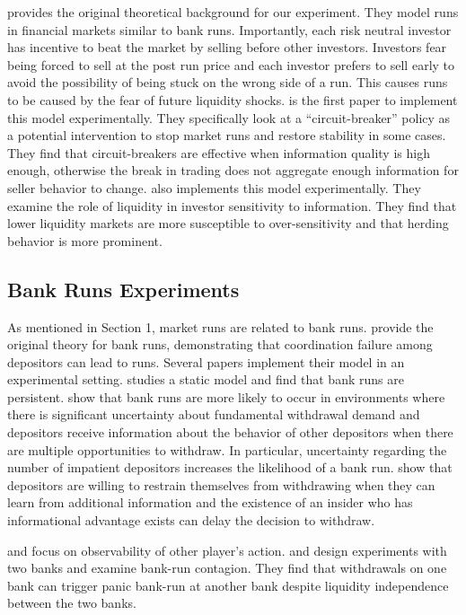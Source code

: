 \documentclass[11pt]{article}
\begin{document}
\cite{bernardo2004liquidity} provides the original theoretical background for our experiment. They model runs in financial markets similar to bank runs. Importantly, each risk neutral investor has incentive to beat the market by selling before other investors. Investors fear being forced to sell at the post run price and each investor prefers to sell early to avoid the possibility of being stuck on the wrong side of a run. This causes runs to be caused by the fear of future liquidity shocks. \cite{magnani2020dynamic} is the first paper to implement this model experimentally. They specifically look at a ``circuit-breaker'' policy as a potential intervention to stop market runs and restore stability in some cases. They find that circuit-breakers are effective when information quality is high enough, otherwise the break in trading does not aggregate enough information for seller behavior to change. \cite{choi2022market} also implements this model experimentally. They examine the role of liquidity in investor sensitivity to information. They find that lower liquidity markets are more susceptible to over-sensitivity and that herding behavior is more prominent. 




\subsection{Bank Runs Experiments}

As mentioned in Section 1, market runs are related to bank runs. \cite{diamond1983bank} provide the original theory for bank runs, demonstrating that coordination failure among depositors can lead to runs. Several papers implement their model in an experimental setting. \cite{madies2006experimental} studies a static model and find that bank runs are persistent. \cite{garratt2009bank} show that bank runs are more likely to occur in environments where there is significant uncertainty about fundamental withdrawal demand and depositors receive information about the behavior of other depositors when there are multiple opportunities to withdraw. In particular,  uncertainty regarding the number of impatient depositors increases the likelihood of a bank run.  \cite{schotter2009dynamics} show that depositors are willing to restrain themselves from withdrawing when they can learn from additional information and the existence of an insider who has informational advantage exists can delay the decision to withdraw.



\cite{kiss2014social} and \cite{kiss2018panic} focus on observability of other player's action. \cite{chakravarty2014experiment} and \cite{brown2017understanding} design experiments with two banks and examine bank-run contagion. They find that withdrawals on one bank can trigger panic bank-run at another bank despite liquidity independence between the two banks.
\end{document}

